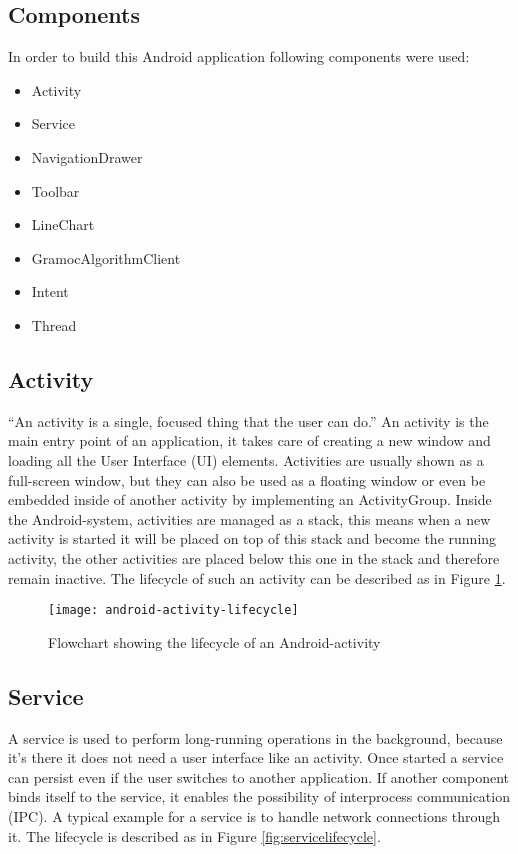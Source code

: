 \subsection{Components}
In order to build this Android application following components were used:

\begin{itemize}
	\item Activity
	\item Service
	\item NavigationDrawer
	\item Toolbar
	\item LineChart
	\item GramocAlgorithmClient
	\item Intent
	\item Thread
\end{itemize}

\subsection{Activity}
``An activity is a single, focused thing that the user can do.'' \cite{AndroidActivity} An activity is the main entry point of an application, it takes care of creating a new window and loading all the User Interface (UI) elements. Activities are usually shown as a full-screen window, but they can also be used as a floating window or even be embedded inside of another activity by implementing an ActivityGroup. Inside the Android-system, activities are managed as a stack, this means when a new activity is started it will be placed on top of this stack and become the running activity, the other activities are placed below this one in the stack and therefore remain inactive. The lifecycle of such an activity can be described as in Figure \ref{fig:activitylifecycle}.

\begin{figure}[H]
	\centering
	\texttt{[image: android-activity-lifecycle]}
	\caption{Flowchart showing the lifecycle of an Android-activity}
	\label{fig:activitylifecycle}
\end{figure}

\subsection{Service}
A service is used to perform long-running operations in the background, because it's there it does not need a user interface like an activity. Once started a service can persist even if the user switches to another application. If another component binds itself to the service, it enables the possibility of interprocess communication (IPC). A typical example for a service is to handle network connections through it. The lifecycle is described as in Figure \ref{fig:servicelifecycle}.

